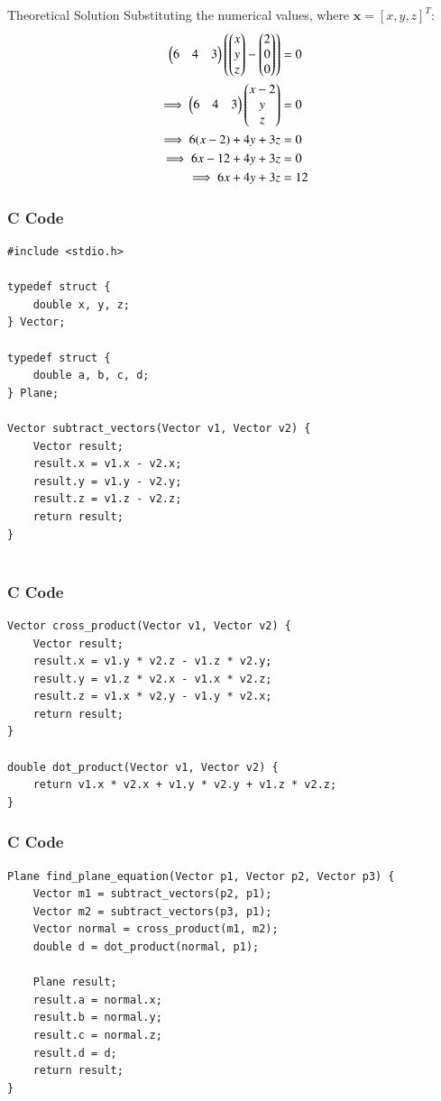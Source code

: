 \documentclass{beamer}
\begin{document}
\begin{frame}{Theoretical Solution}
Substituting the numerical values, where $\mathbf{x} = [x, y, z]^T$:
\begin{align*}
    \begin{pmatrix}6 & 4 & 3\end{pmatrix} \left( \begin{pmatrix}x\\y\\z\end{pmatrix} - \begin{pmatrix}2\\0\\0\end{pmatrix} \right) &= 0 \\
    \implies \begin{pmatrix}6 & 4 & 3\end{pmatrix} \begin{pmatrix}x-2\\y\\z\end{pmatrix} &= 0 \\
    \implies 6(x-2) + 4y + 3z &= 0 \\
    \implies 6x - 12 + 4y + 3z &= 0 \\
    \implies 6x + 4y + 3z &= 12
\end{align*}
\end{frame}


\begin{frame}[fragile]
    \frametitle{C Code}

    \begin{lstlisting}
#include <stdio.h>

typedef struct {
    double x, y, z;
} Vector;

typedef struct {
    double a, b, c, d;
} Plane;

Vector subtract_vectors(Vector v1, Vector v2) {
    Vector result;
    result.x = v1.x - v2.x;
    result.y = v1.y - v2.y;
    result.z = v1.z - v2.z;
    return result;
}


    \end{lstlisting}
\end{frame}

\begin{frame}[fragile]
    \frametitle{C Code}

    \begin{lstlisting}
Vector cross_product(Vector v1, Vector v2) {
    Vector result;
    result.x = v1.y * v2.z - v1.z * v2.y;
    result.y = v1.z * v2.x - v1.x * v2.z;
    result.z = v1.x * v2.y - v1.y * v2.x;
    return result;
}

double dot_product(Vector v1, Vector v2) {
    return v1.x * v2.x + v1.y * v2.y + v1.z * v2.z;
}

    \end{lstlisting}
\end{frame}
\begin{frame}[fragile]
    \frametitle{C Code}

    \begin{lstlisting}
Plane find_plane_equation(Vector p1, Vector p2, Vector p3) {
    Vector m1 = subtract_vectors(p2, p1);
    Vector m2 = subtract_vectors(p3, p1);
    Vector normal = cross_product(m1, m2);
    double d = dot_product(normal, p1);

    Plane result;
    result.a = normal.x;
    result.b = normal.y;
    result.c = normal.z;
    result.d = d;
    return result;
}


    \end{lstlisting}
\end{frame}
\end{document}
